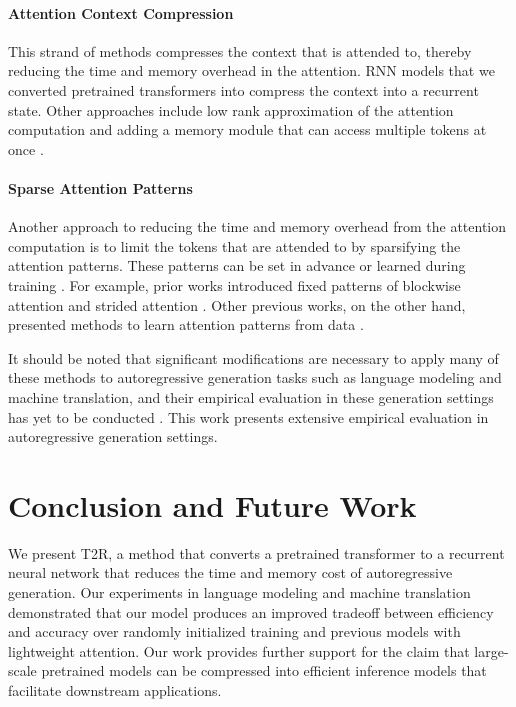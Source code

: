 \documentclass[11pt,a4paper]{article}
\newcommand{\TRNN}{T2R\xspace}
\begin{document}
\paragraph{Attention Context Compression}
This strand of methods compresses the context that is attended to, thereby reducing the time and memory overhead in the attention.
RNN models that we converted pretrained transformers into \cite{katharopoulos-et-al-2020, RFA, performer} compress the context into a recurrent state.
Other approaches include low rank approximation of the attention computation \cite{Wang2020LinformerSW, synthesizer} and adding a memory module that can access multiple tokens at once \cite{liuetal2018,dai-etal-2019-transformerxl,pmlr-v97-lee19d,ainslie-etal-2020-etc,raeetal2020,longformer,bigbird}.


\paragraph{Sparse Attention Patterns}
Another approach to reducing the time and memory overhead from the attention computation is to limit the tokens that are attended to by sparsifying the attention patterns.
These patterns can be set in advance or learned during training \cite{Tay2020EfficientTA}.
For example, prior works introduced fixed patterns of blockwise attention \cite{qiu-etal-2020-blockwise} and strided attention \cite{Child2019,longformer,bigbird}.
Other previous works, on the other hand, presented methods to learn attention patterns from data \cite{sukhbaatar-etal-2019-adaptive,context-based-sparse,sinkhorn}.

It should be noted that significant modifications are necessary to apply many of these methods to autoregressive generation tasks such as language modeling and machine translation, and their empirical evaluation in these generation settings has yet to be conducted \cite{RFA}.
This work presents extensive empirical evaluation in autoregressive generation settings.


\section{Conclusion and Future Work}
We present \TRNN, a method that converts a pretrained transformer to a recurrent neural network that reduces the time and memory cost of autoregressive generation.
Our experiments in language modeling and machine translation demonstrated that our model produces an improved tradeoff between efficiency and accuracy over randomly initialized training and previous models with lightweight attention.
Our work provides further support for the claim that large-scale pretrained models can be compressed into efficient inference models that facilitate downstream applications.
\end{document}
